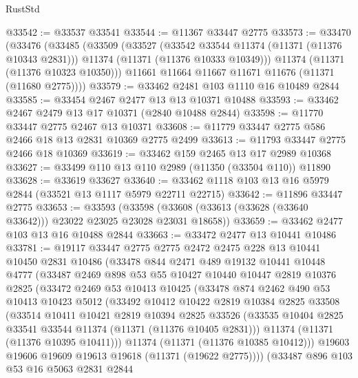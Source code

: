 \begin{lexlean}{RustStd}
\begin{coremodule}
@33542 := @33537 @33541
@33544 := @11367 @33447 @2775
@33573 := @33470
    (@33476
      (@33485
        (@33509
          (@33527
            (@33542 @33544 @11374 (@11371 (@11376 @10343 @2831)))
            @11374
            (@11371 (@11376 @10333 @10349)))
          @11374
          (@11371 (@11376 @10323 @10350)))
        @11661
        @11664
        @11667
        @11671
        @11676
        (@11371 (@11680 @2775))))
@33579 := @33462 @2481 @103 @1110 @16 @10489 @2844
@33585 := @33454 @2467 @2477 @13 @13 @10371 @10488
@33593 := @33462 @2467 @2479 @13 @17 @10371 (@2840 @10488 @2844)
@33598 := @11770 @33447 @2775 @2467 @13 @10371
@33608 := @11779 @33447 @2775 @586 @2466 @18 @13 @2831 @10369 @2775 @2499
@33613 := @11793 @33447 @2775 @2466 @18 @10369
@33619 := @33462 @159 @2465 @13 @17 @2989 @10368
@33627 := @33499 @110 @13 @110 @2989 (@11350 (@33504 @110)) @11890
@33628 := @33619 @33627
@33640 := @33462 @1118 @103 @13 @16 @5979 @2844 (@33521 @13 @1117 @5979 @22711 @22715)
@33642 := @11896 @33447 @2775
@33653 := @33593
    (@33598 (@33608 (@33613 (@33628 (@33640 @33642))) @23022 @23025 @23028 @23031 @18658))
@33659 := @33462 @2477 @103 @13 @16 @10488 @2844
@33663 := @33472 @2477 @13 @10441 @10486
@33781 := @19117
    @33447
    @2775
    @2775
    @2472
    @2475
    @228
    @13
    @10441
    @10450
    @2831
    @10486
    (@33478
      @844
      @2471
      @489
      @19132
      @10441
      @10448
      @4777
      (@33487
        @2469
        @898
        @53
        @55
        @10427
        @10440
        @10447
        @2819
        @10376
        @2825
        (@33472
          @2469
          @53
          @10413
          @10425
          (@33478
            @874
            @2462
            @490
            @53
            @10413
            @10423
            @5012
            (@33492
              @10412
              @10422
              @2819
              @10384
              @2825
              @33508
              (@33514
                @10411
                @10421
                @2819
                @10394
                @2825
                @33526
                (@33535 @10404 @2825 @33541 @33544 @11374 (@11371 (@11376 @10405 @2831)))
                @11374
                (@11371 (@11376 @10395 @10411)))
              @11374
              (@11371 (@11376 @10385 @10412)))
            @19603
            @19606
            @19609
            @19613
            @19618
            (@11371 (@19622 @2775))))
        (@33487
          @896
          @103
          @53
          @16
          @5063
          @2831
          @2844

\end{coremodule}
\end{lexlean}
